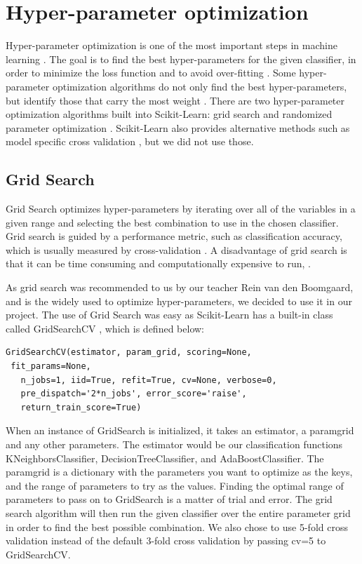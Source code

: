 \documentclass{article}
\begin{document}
\section{Hyper-parameter optimization}

	Hyper-parameter optimization is one of the most important steps in machine learning \cite{bardenet}. The goal is to find the best hyper-parameters for the given classifier, in order to minimize the loss function and to avoid over-fitting \cite{Bergstra}. Some hyper-parameter optimization algorithms do not only find the best hyper-parameters, but identify those that carry the most weight \cite{Bergstra}.
	There are two hyper-parameter optimization algorithms built into Scikit-Learn: grid search and randomized parameter optimization \cite{gridsearch}. Scikit-Learn also provides alternative methods such as model specific cross validation  \cite{HyperparameterOptimisationWiki}, but we did not use those.  
	
	\subsection{Grid Search}
	
		Grid Search optimizes hyper-parameters by iterating over all of the variables in a given range and selecting the best combination to use in the chosen classifier. Grid search is guided by a performance metric, such as classification accuracy, which is usually measured by cross-validation \cite{HyperparameterOptimisationWiki}. A disadvantage of grid search is that it can be time consuming and computationally expensive to run, \cite{HyperparameterOptimisationWiki}.

		As grid search was recommended to us by our teacher Rein van den Boomgaard, and is the widely used to optimize hyper-parameters, we decided to use it in our project.
The use of Grid Search was easy as Scikit-Learn has a built-in class called GridSearchCV \cite{gridsearch}, which is defined below:
		
		
	\begin{lstlisting}
GridSearchCV(estimator, param_grid, scoring=None,
 fit_params=None, 
   n_jobs=1, iid=True, refit=True, cv=None, verbose=0, 
   pre_dispatch='2*n_jobs', error_score='raise',
   return_train_score=True)
	\end{lstlisting}
		
	When an instance of GridSearch is initialized, it takes an estimator, a param\textunderscore grid and any other parameters. The estimator would be our classification functions KNeighborsClassifier, DecisionTreeClassifier, and AdaBoostClassifier. The param\textunderscore grid is a dictionary with the parameters you want to optimize as the keys, and the range of parameters to try as the values. Finding the optimal range of parameters to pass on to GridSearch is a matter of trial and error. The grid search algorithm will then run the given classifier over the entire parameter grid in order to find the best possible combination. We also chose to use 5-fold cross validation instead of the default 3-fold cross validation by passing cv=5 to GridSearchCV. 
\end{document}
